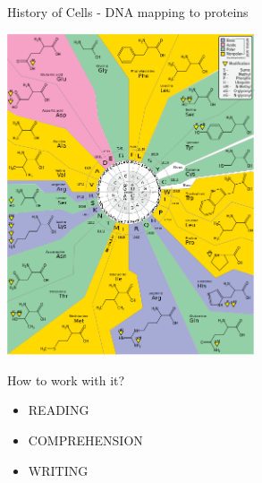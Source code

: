 \begin{frame}{History of Cells - DNA mapping to proteins}
\footnotesize
\begin{center}
\includegraphics[width=0.55\textwidth]{./images/GeneticCode21-version-2.png} 
\end{center}
\end{frame}

\begin{frame}{How to work with it?}
\footnotesize

 
\begin{itemize}
\item READING
\item COMPREHENSION
\item WRITING
\end{itemize} 
\end{frame}

